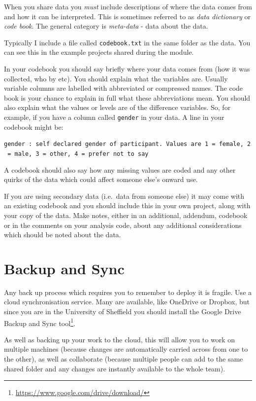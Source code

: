 \documentclass[
  12pt,
  a5paper,
]{book}
\DeclareRobustCommand{\href}[2]{#2\footnote{\url{#1}}}
\begin{document}
When you share data you \emph{must} include descriptions of where the data comes from and how it can be interpreted. This is sometimes referred to as \emph{data dictionary} or \emph{code book}. The general category is \emph{meta-data} - data about the data.

Typically I include a file called \texttt{codebook.txt} in the same folder as the data. You can see this in the example projects shared during the module.

In your codebook you should say briefly where your data comes from (how it was collected, who by etc). You should explain what the variables are. Usually variable columns are labelled with abbreviated or compressed names. The code book is your chance to explain in full what these abbreviations mean. You should also explain what the values or levels are of the difference variables. So, for example, if you have a column called \texttt{gender} in your data. A line in your codebook might be:

\texttt{gender\ :\ self\ declared\ gender\ of\ participant.\ Values\ are\ 1\ =\ female,\ 2\ =\ male,\ 3\ =\ other,\ 4\ =\ prefer\ not\ to\ say}

A codebook should also say how any missing values are coded and any other quirks of the data which could affect someone else's onward use.

If you are using secondary data (i.e.~data from someone else) it may come with an existing codebook and you should include this in your own project, along with your copy of the data. Make notes, either in an additional, addendum, codebook or in the comments on your analysis code, about any additional considerations which should be noted about the data.

\hypertarget{backup-and-sync}{%
\section{Backup and Sync}\label{backup-and-sync}}

Any back up process which requires you to remember to deploy it is fragile. Use a cloud synchronisation service. Many are available, like OneDrive or Dropbox, but since you are in the University of Sheffield you should install the \href{https://www.google.com/drive/download/}{Google Drive Backup and Sync tool}.

As well as backing up your work to the cloud, this will allow you to work on multiple machines (because changes are automatically carried across from one to the other), as well as collaborate (because multiple people can add to the same shared folder and any changes are instantly available to the whole team).
\end{document}
